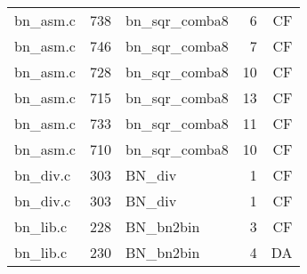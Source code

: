 \begin{table}[h!]
\begin{tabular}{lrlrr}
bn\_asm.c& 738&bn\_sqr\_comba8&6 &CF\\
bn\_asm.c& 746&bn\_sqr\_comba8&7 &CF\\
bn\_asm.c& 728&bn\_sqr\_comba8&10&CF\\
bn\_asm.c& 715&bn\_sqr\_comba8&13&CF\\
bn\_asm.c& 733&bn\_sqr\_comba8&11&CF\\
bn\_asm.c& 710&bn\_sqr\_comba8&10&CF\\
bn\_div.c& 303&BN\_div&1 &CF\\
bn\_div.c& 303&BN\_div&1 &CF\\
bn\_lib.c& 228&BN\_bn2bin&3 &CF\\
bn\_lib.c& 230&BN\_bn2bin&4 &DA\\
\hline
\end{tabular}
\renewcommand{\baselinestretch}{1.0}\selectfont
\end{table}
